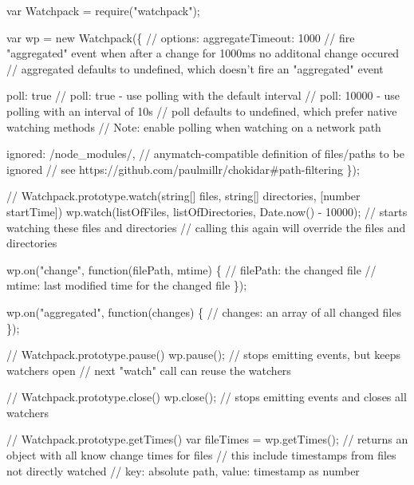 \begin{DoxyCode}
var Watchpack = require("watchpack");

var wp = new Watchpack(\{
    // options:
    aggregateTimeout: 1000
    // fire "aggregated" event when after a change for 1000ms no additonal change occured
    // aggregated defaults to undefined, which doesn't fire an "aggregated" event

    poll: true
    // poll: true - use polling with the default interval
    // poll: 10000 - use polling with an interval of 10s
    // poll defaults to undefined, which prefer native watching methods
    // Note: enable polling when watching on a network path

    ignored: /node\_modules/,
    // anymatch-compatible definition of files/paths to be ignored
    // see https://github.com/paulmillr/chokidar#path-filtering
\});

// Watchpack.prototype.watch(string[] files, string[] directories, [number startTime])
wp.watch(listOfFiles, listOfDirectories, Date.now() - 10000);
// starts watching these files and directories
// calling this again will override the files and directories

wp.on("change", function(filePath, mtime) \{
    // filePath: the changed file
    // mtime: last modified time for the changed file
\});

wp.on("aggregated", function(changes) \{
    // changes: an array of all changed files
\});

// Watchpack.prototype.pause()
wp.pause();
// stops emitting events, but keeps watchers open
// next "watch" call can reuse the watchers

// Watchpack.prototype.close()
wp.close();
// stops emitting events and closes all watchers

// Watchpack.prototype.getTimes()
var fileTimes = wp.getTimes();
// returns an object with all know change times for files
// this include timestamps from files not directly watched
// key: absolute path, value: timestamp as number
\end{DoxyCode}
 